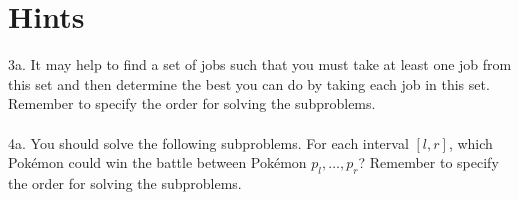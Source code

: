 \documentclass[12pt]{article}
\begin{document}
\section*{Hints}
\noindent 3a. It may help to find a set of jobs such that you must take at least one job from this set and then determine the best you can do by taking each job in this set. Remember to specify the order for solving the subproblems.\\
\\
4a. You should solve the following subproblems. For each interval $[l,r]$, which Pok\'{e}mon could win the battle between Pok\'{e}mon $p_l,\ldots,p_r$? Remember to specify the order for solving the subproblems.
\end{document}
